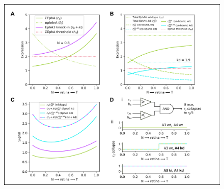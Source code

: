 \documentclass[11pt, a4paper]{article}
\begin{document}
\begin{figure}
\includegraphics[width=0.95\linewidth]{./images/EphA_manipulations_explanation.png}

\end{figure}
\end{document}
